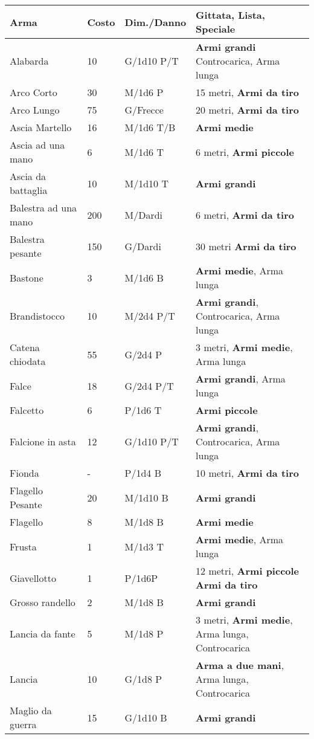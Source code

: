 \documentclass[12pt,a4paper,twoside,openany]{book}
\begin{document}
\begin{xltabular}{0.99\textwidth}{lllX}
\textbf{Arma}&\textbf{Costo}&\textbf{Dim./Danno} & \textbf{Gittata, Lista, Speciale}\\
\toprule
Alabarda& 10 & G/1d10 P/T& \textbf{Armi grandi} Controcarica, Arma lunga \\
Arco Corto& 30 & M/1d6 P& 15 metri, \textbf{Armi da tiro}\\
Arco Lungo& 75 & G/Frecce& 20 metri, \textbf{Armi da tiro}\\
Ascia Martello& 16 & M/1d6 T/B& \textbf{Armi medie}\\
Ascia ad una mano& 6  & M/1d6 T& 6 metri, \textbf{Armi piccole}\\
Ascia da battaglia& 10 & M/1d10 T&\textbf{Armi grandi}\\
Balestra ad una mano& 200& M/Dardi& 6 metri, \textbf{Armi da tiro}\\
Balestra pesante& 150 & G/Dardi& 30 metri \textbf{Armi da tiro}\\
Bastone& 3& M/1d6 B& \textbf{Armi medie}, Arma lunga\\
Brandistocco& 10 & M/2d4 P/T& \textbf{Armi grandi}, Controcarica, Arma lunga\\
Catena chiodata& 55 & G/2d4 P& 3 metri, \textbf{Armi medie}, Arma lunga\\
Falce& 18 & G/2d4 P/T& \textbf{Armi grandi}, Arma lunga\\
Falcetto& 6& P/1d6 T& \textbf{Armi piccole}\\
Falcione in asta& 12 & G/1d10 P/T& \textbf{Armi grandi}, Controcarica, Arma lunga\\
Fionda& -& P/1d4 B& 10 metri, \textbf{Armi da tiro}\\
Flagello Pesante& 20 & M/1d10 B& \textbf{Armi grandi}\\
Flagello& 8& M/1d8 B& \textbf{Armi medie}\\
Frusta& 1& M/1d3 T& \textbf{Armi medie}, Arma lunga\\
Giavellotto& 1& P/1d6P& 12 metri,  \textbf{Armi piccole} \textbf{Armi da tiro}\\
Grosso randello& 2& M/1d8 B&\textbf{Armi grandi}\\
Lancia da fante& 5& M/1d8 P&3 metri, \textbf{Armi medie}, Arma lunga, Controcarica\\
Lancia& 10 & G/1d8 P&\textbf{Arma a due mani}, Arma lunga, Controcarica\\
Maglio da guerra& 15& G/1d10 B& \textbf{Armi grandi}\\

\end{xltabular}
\end{document}
